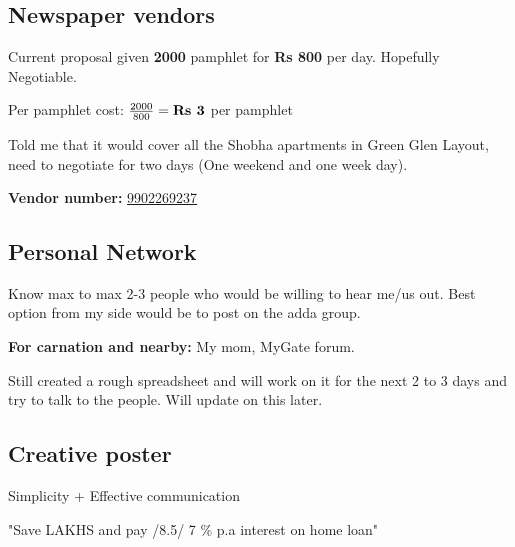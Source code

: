 \documentclass[12pt, a4paper]{article}
\begin{document}
\date{\today}
\maketitle

\subsection{Newspaper vendors}

Current proposal given \textbf{2000} pamphlet for \textbf{Rs 800} per day. Hopefully Negotiable.

\vspace{0.5cm}

Per pamphlet cost: $\frac{2000}{800} = \textbf{Rs \the\numexpr 2000 / 800 \relax} $ per pamphlet

\bigskip

\noindent Told me that it would cover all the Shobha apartments in Green Glen Layout, need to negotiate for two days (One weekend and one week day).

\bigskip

\textbf{Vendor number:} \href{tel:+919902269237}{9902269237}

\subsection{Personal Network}

Know max to max 2-3 people who would be willing to hear me/us out. Best option from my side would be to post on the adda group.

\vspace{0.25cm}

\noindent \textbf{For carnation and nearby:} My mom, MyGate forum.

\vspace{0.25cm}

\noindent Still created a rough spreadsheet and will work on it for the next 2 to 3 days and try to talk to the people. Will update on this later.

\subsection{Creative poster}

Simplicity + Effective communication

\vspace{0.3cm}

"Save LAKHS and pay /8.5/ 7 \% p.a interest on home loan"
\end{document}
